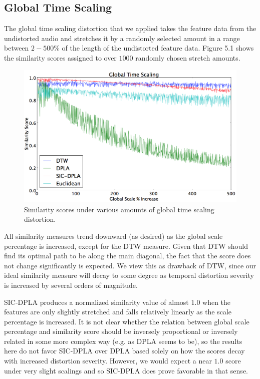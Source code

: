 \documentclass[12pt]{report} 	%
\numberwithin{figure}{chapter}
\numberwithin{table}{chapter}
\numberwithin{equation}{chapter}
\begin{document}
\begin{flushleft}
\subsection{Global Time Scaling}
The global time scaling distortion that we applied takes the feature data from the undistorted audio and stretches it by a randomly selected amount in a range between $2-500\%$ of the length of the undistorted feature data. Figure 5.1 shows the similarity scores assigned to over $1000$ randomly chosen stretch amounts.
\begin{figure}[h!]
\begin{center}
\includegraphics[scale=0.5,width=\linewidth]{GlobalTimeScaling}
\caption[Global time scaling results]{Similarity scores under various amounts of global time scaling distortion.}
\end{center}
\end{figure}
All similarity measures trend downward (as desired) as the global scale percentage is increased, except for the DTW measure. Given that DTW should find its optimal path to be along the main diagonal, the fact that the score does not change significantly is expected. We view this as drawback of DTW, since our ideal similarity measure will decay to some degree as temporal distortion severity is increased by several orders of magnitude.

SIC-DPLA produces a normalized similarity value of almost $1.0$ when the features are only slightly stretched and falls relatively linearly as the scale percentage is increased. It is not clear whether the relation between global scale percentage and similarity score should be inversely proportional or inversely related in some more complex way (e.g. as DPLA seems to be), so the results here do not favor SIC-DPLA over DPLA based solely on how the scores decay with increased distortion severity. However, we would expect a near $1.0$ score under very slight scalings and so SIC-DPLA does prove favorable in that sense.


\end{flushleft}
\end{document}
